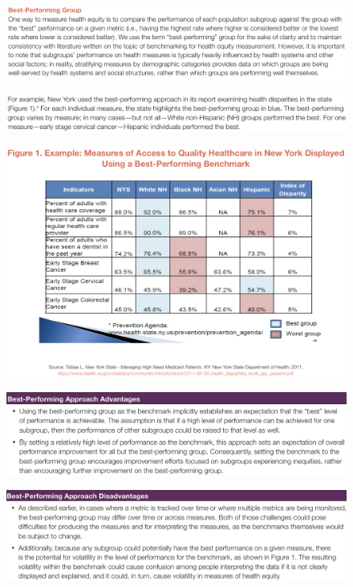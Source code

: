 \documentclass[14pt]{extarticle}
\begin{document}
\begin{figure}[H]
    \centering
    \includegraphics[width=1\textwidth]{fig4.png}
\end{figure}
\begin{figure}[H]
    \centering
    \includegraphics[width=1\textwidth]{fig5.png}
\end{figure}
\begin{figure}[H]
    \centering
    \includegraphics[width=1\textwidth]{fig6.png}
\end{figure}
\begin{figure}[H]
    \centering
    \includegraphics[width=1\textwidth]{fig7.png}
\end{figure}
\begin{figure}[H]
    \centering
    \includegraphics[width=1\textwidth]{fig8.png}
\end{figure}
\end{document}
